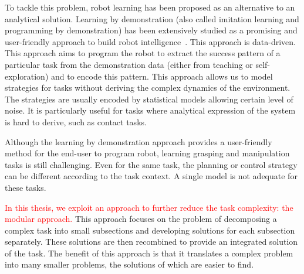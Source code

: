 To tackle this problem, robot learning has been proposed as an alternative to an analytical solution. Learning by demonstration (also called imitation learning and programming by demonstration) has been extensively studied as a promising and user-friendly approach to build robot intelligence~\citep{schaal2003computational,dillmann2004teaching,demiris2006hierarchical,calinon2007incremental}. This approach is data-driven. This approach aims to program the robot to extract the success pattern of a particular task from the demonstration data (either from teaching or self-exploration) and to encode this pattern. This approach allows us to model strategies for tasks without deriving the complex dynamics of the environment. The strategies are usually encoded by statistical models allowing certain level of noise. It is particularly useful for tasks where analytical expression of the system is hard to derive, such as contact tasks.


Although the learning by demonstration approach provides a user-friendly method for the end-user to program robot, learning grasping and manipulation tasks is still challenging. Even for the same task, the planning or control strategy can be different according to the task context. A single model is not adequate for these tasks.


\textcolor{red}{In this thesis, we exploit an approach to further reduce the task complexity: the modular approach.}
This approach focuses on the problem of decomposing a complex task into small subsections and developing solutions for each subsection separately. These solutions are then recombined to provide an integrated solution of the task. The benefit of this approach is that it translates a complex problem into many smaller problems, the solutions of which are easier to find.

